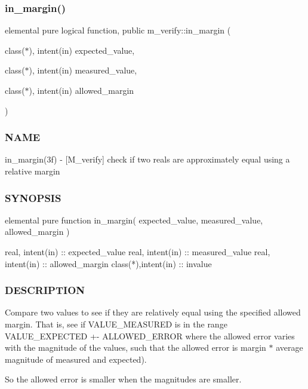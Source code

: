 \subsubsection{\texorpdfstring{in\+\_\+margin()}{in\_margin()}}
{\footnotesize\ttfamily elemental pure logical function, public m\+\_\+verify\+::in\+\_\+margin (\begin{DoxyParamCaption}\item[{class($\ast$), intent(in)}]{expected\+\_\+value,  }\item[{class($\ast$), intent(in)}]{measured\+\_\+value,  }\item[{class($\ast$), intent(in)}]{allowed\+\_\+margin }\end{DoxyParamCaption})}



\subsubsection*{N\+A\+ME}

in\+\_\+margin(3f) -\/ \mbox{[}M\+\_\+verify\mbox{]} check if two reals are approximately equal using a relative margin 

\subsubsection*{S\+Y\+N\+O\+P\+S\+IS}

\begin{DoxyVerb} elemental pure function in_margin( expected_value, measured_value, allowed_margin )

  real, intent(in)    :: expected_value
  real, intent(in)    :: measured_value
  real, intent(in)    :: allowed_margin
  class(*),intent(in) :: invalue
\end{DoxyVerb}


\subsubsection*{D\+E\+S\+C\+R\+I\+P\+T\+I\+ON}

Compare two values to see if they are relatively equal using the specified allowed margin. That is, see if V\+A\+L\+U\+E\+\_\+\+M\+E\+A\+S\+U\+R\+ED is in the range V\+A\+L\+U\+E\+\_\+\+E\+X\+P\+E\+C\+T\+ED +-\/ A\+L\+L\+O\+W\+E\+D\+\_\+\+E\+R\+R\+OR where the allowed error varies with the magnitude of the values, such that the allowed error is margin $\ast$ average magnitude of measured and expected).

So the allowed error is smaller when the magnitudes are smaller.

